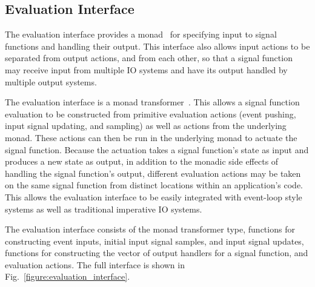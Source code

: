 \documentclass[draft]{llncs}
\begin{document}
\subsection{Evaluation Interface}
The evaluation interface provides a monad~\cite{PeytonJones1993,PeytonJones2001}
for specifying input to signal functions and handling their output. This
interface also allows input actions to be separated from output actions, and
from each other, so that a signal function may receive input from multiple IO
systems and have its output handled by multiple output systems.

The evaluation interface is a monad transformer~\cite{Liang1995}. This allows
a signal function evaluation to be constructed from primitive evaluation actions
(event pushing, input signal updating, and sampling) as well as actions from the
underlying monad. These actions can then be run in the underlying monad
to actuate the signal function. Because the actuation takes a signal function's
state as input and produces a new state as output, in addition to the monadic
side effects of handling the signal function's output, different evaluation
actions may be taken on the same signal function from distinct locations within
an application's code. This allows the evaluation interface to be easily
integrated with event-loop style systems as well as traditional imperative
IO systems.

The evaluation interface consists of the monad transformer type, functions for
constructing event inputs, initial input signal samples, and input signal
updates, functions for constructing the vector of output handlers for a signal
function, and evaluation actions. The full interface is shown in Fig.~\ref{figure:evaluation_interface}.
\end{document}
